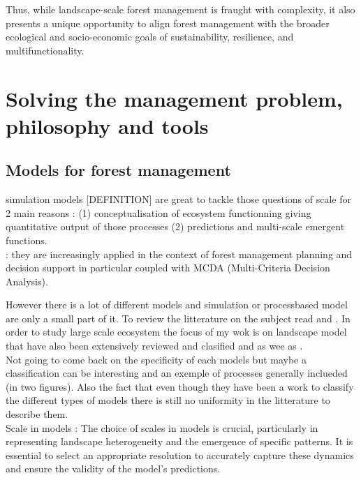\documentclass{article}
\begin{document}
Thus, while landscape-scale forest management is fraught with complexity, it also presents a unique opportunity to align forest management with the broader ecological and socio-economic goals of sustainability, resilience, and multifunctionality.

\section{Solving the management problem, philosophy and tools}

\subsection{Models for forest management}

simulation models [DEFINITION] are great to tackle those questions of scale for 2 main reasons \cite{seidlScalingIssuesForest2013} : (1) conceptualisation of ecosystem functionning giving quantitative output of those processes (2) predictions and multi-scale emergent functions. \\
\cite{wolfslehnerHarnessingEcosystemModels2010} : they are increasingly applied in the context of forest management planning and decision support in particular coupled with MCDA (Multi-Criteria Decision Analysis).

However there is a lot of different models and simulation or processbased model are only a small part of it. To review the litterature on the subject read \cite{pretzschModelsForestEcosystem2007} and \cite{shifleyFutureModelingForest2017}. In order to study large scale ecosystem the focus of my wok is on landscape model that have also been extensively reviewed and clasified \cite{heForestLandscapeModels2008} and \cite{xiReviewForestLandscape2009} as wee as \cite{schellerEcologicalClassificationForest2007}. \\

Not going to come back on the specificity of each models but maybe a classification can be interesting and an exemple of processes generally inclueded (in two figures). Also the fact that even though they have been a work to classify the different types of models there is still no uniformity in the litterature to describe them. \\

Scale in models : \textcite{seidlScalingIssuesForest2013} The choice of scales in models is crucial, particularly in representing landscape heterogeneity and the emergence of specific patterns. It is essential to select an appropriate resolution to accurately capture these dynamics and ensure the validity of the model's predictions.
\end{document}

